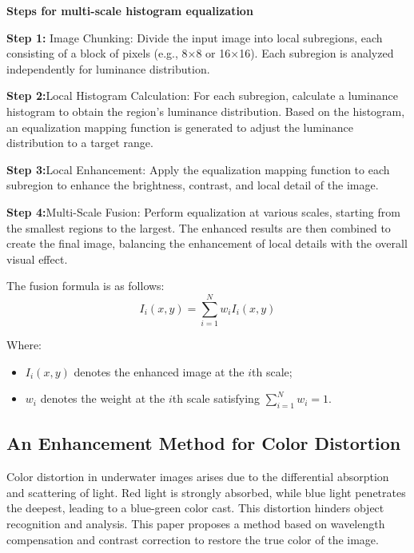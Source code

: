 \documentclass[withoutpreface,bwprint]{cumcmthesis}
\begin{document}
\textbf{Steps for multi-scale histogram equalization}

\textbf{Step 1:} Image Chunking: Divide the input image into local subregions, each consisting of a block of pixels (e.g., 8×8 or 16×16). Each subregion is analyzed independently for luminance distribution.

\vspace{0.5em}
\textbf{Step 2:}Local Histogram Calculation: For each subregion, calculate a luminance histogram to obtain the region’s luminance distribution. Based on the histogram, an equalization mapping function is generated to adjust the luminance distribution to a target range.

\vspace{0.5em}
\textbf{Step 3:}Local Enhancement: Apply the equalization mapping function to each subregion to enhance the brightness, contrast, and local detail of the image.

\vspace{0.5em}
\textbf{Step 4:}Multi-Scale Fusion: Perform equalization at various scales, starting from the smallest regions to the largest. The enhanced results are then combined to create the final image, balancing the enhancement of local details with the overall visual effect.         


The fusion formula is as follows:
\[I_{i}(x, y) = \sum_{i=1}^{N} w_i I_i(x, y)\]

Where:

\begin{itemize}[itemindent=2em]
    \item $I_i(x, y)$ denotes the enhanced image at the $i$th scale;

    \item $w_i$ denotes the weight at the $i$th scale satisfying $\sum_{i=1}^{N} w_i = 1$.
\end{itemize}

\subsection{An Enhancement Method for Color Distortion}

Color distortion in underwater images arises due to the differential absorption and scattering of light. Red light is strongly absorbed, while blue light penetrates the deepest, leading to a blue-green color cast. This distortion hinders object recognition and analysis. This paper proposes a method based on wavelength compensation and contrast correction to restore the true color of the image.
\end{document}
